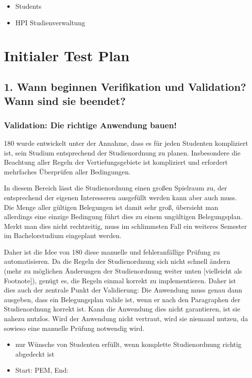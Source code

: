 \documentclass[ngerman]{article}
\begin{document}
\begin{itemize}
    \item Students
    \item HPI Studienverwaltung
\end{itemize}

\section{Initialer Test Plan}

\subsection{1. Wann beginnen Verifikation und Validation? Wann sind sie beendet?}

\subsubsection{Validation: Die richtige Anwendung bauen!}

180 wurde entwickelt unter der Annahme, dass es für jeden Studenten
kompliziert ist, sein Studium entsprechend der Studienordnung zu planen.
Insbesondere die Beachtung aller Regeln der Vertiefungsgebiete ist
kompliziert und erfordert mehrfaches Überprüfen aller Bedingungen.

In diesem Bereich lässt die Studienordnung einen großen Spielraum zu, der entsprechend der eigenen Interesseren ausgefüllt werden kann aber auch muss.
Die Menge aller gültigen Belegungen ist damit sehr groß, übersieht man allerdings eine einzige Bedingung führt dies zu einem ungültigen Belegungsplan.
Merkt man dies nicht rechtzeitig, muss im schlimmsten Fall ein weiteres Semester im Bachelorstudium eingeplant werden.

Daher ist die Idee von 180 diese manuelle und fehleranfällige Prüfung zu automatisieren.
Da die Regeln der Studienordnung sich nicht schnell ändern (mehr zu möglichen Änderungen der Studienordnung weiter unten {[}vielleicht als Footnote{]}), genügt es, die Regeln einmal korrekt zu implementieren.
Daher ist dies auch der zentrale Punkt der Validierung:
Die Anwendung muss genau dann ausgeben, dass ein Belegungsplan valide ist, wenn er nach den Paragraphen der Studienordnung korrekt ist.
Kann die Anwendung dies nicht garantieren, ist sie nahezu nutzlos.
Wird der Anwendung nicht vertraut, wird sie niemand nutzen, da sowieso eine manuelle Prüfung notwendig wird.

\begin{itemize}
    \item nur Wünsche von Studenten erfüllt, wenn komplette Studienordnung richtig abgedeckt ist
    \item Start: PEM, End:
\end{itemize}
\end{document}
